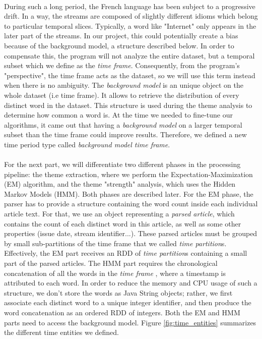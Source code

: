 \paragraph{}
During such a long period, the French language has been subject to a progressive drift. In a way, the streams are composed of slightly different idioms which belong to particular temporal slices. Typically, a word like "Internet" only appears in the later part of the streams. In our project, this could potentially create a bias because of the background model, a structure described below. In order to compensate this, the program will not analyze the entire dataset, but a temporal subset which we define as the \emph{time frame}. Consequently, from the program's "perspective", the time frame acts as the dataset, so we will use this term instead when there is no ambiguity.
The \emph{background model} is an unique object on the whole dataset (i.e time frame). It allows to retrieve the distribution of every distinct word in the dataset. This structure is used during the theme analysis to determine how common a word is. At the time we needed to fine-tune our algorithms, it came out that having a \emph{background model} on a larger temporal subset than the time frame could improve results. Therefore, we defined a new time period type called  \emph{background model time frame}.

\paragraph{}
For the next part, we will differentiate two different phases in the processing pipeline: the theme extraction, where we perform the Expectation-Maximization (EM) algorithm, and the theme "strength" analysis, which uses the Hidden Markov Models (HMM). Both phases are described later. For the EM phase, the parser has to provide a structure containing the word count inside each individual article text. For that, we use an object representing a \emph{parsed article}, which contains the count of each distinct word in this article, as well as some other properties (issue date, stream identifier...). These parsed articles must be grouped by small sub-partitions of the time frame that we called \emph{time partition}s. Effectively, the EM part receives an RDD of \emph{time partition}s containing a small part of the parsed articles. The HMM part requires the chronological concatenation of all the words in the \emph{time frame} , where a timestamp is attributed to each word. In order to reduce the memory and CPU usage of such a structure, we don't store the words as Java String objects; rather, we first associate each distinct word to a unique integer identifier, and then produce the word concatenation as an ordered RDD of integers. Both the EM and HMM parts need to access the background model. Figure \ref{fig:time_entities} summarizes the different time entities we defined.

